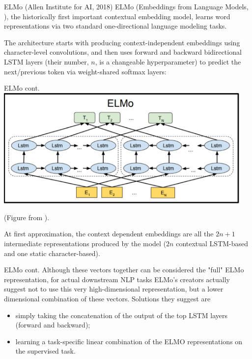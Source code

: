 \documentclass[style=upen, size=14pt]{powerdot}
\theoremstyle{definition}
\begin{document}
\begin{slide}[toc=ELMo]{ELMo (Allen Institute for AI, 2018)}
  ELMo (Embeddings from Language Models, \cite{peters2018deep}), the
  historically first important contextual embedding model, learns word
  representations via two standard one-directional language modeling
  tasks.\bigskip

  The architecture starts with producing context-independent embeddings using
  character-level convolutions, and then uses forward and backward bidirectional
  LSTM layers (their number, $n$, is a changeable hyperparameter) to predict the
  next/previous token via weight-shared softmax layers:
\end{slide}

\begin{slide}[toc=]{ELMo cont.}
  \hspace{0.3cm}\includegraphics[width=0.95\textwidth]{figures/elmo.eps}

  \footnotesize{\hspace{3.3cm}(Figure from \cite{peters2018deep}).}
  
  \normalsize At first approximation, the context dependent embeddings are all
  the $2n +1 $ intermediate representations produced by the model ($2n$
  contextual LSTM-based and one static character-based).
\end{slide}

\begin{slide}[toc=]{ELMo cont.}
  Although these vectors together can be considered the "full" ELMo
  representation, for actual downstream NLP tasks ELMo's creators actually
  suggest not to use this very high-dimensional representation, but a lower
  dimensional combination of these vectors. Solutions they suggest are
  \begin{itemize}
  \item simply taking the concatenation of the output of the top LSTM layers (forward
    and backward);
  \item learning a task-specific linear combination of the ELMO representations on
    the supervised task.
  \end{itemize}
\end{slide}
\end{document}
